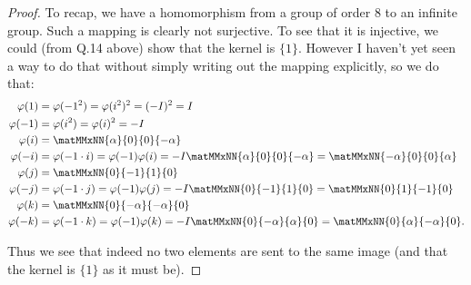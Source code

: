 \begin{proof}
  To recap, we have a homomorphism from a group of order 8 to an infinite group. Such a mapping is
  clearly not surjective. To see that it is injective, we could (from Q.14 above) show that the
  kernel is $\{1\}$. However I haven't yet seen a way to do that without simply writing out the
  mapping explicitly, so we do that:
  \begin{align*}
    \varphi(1) &= \varphi(-1^2) =  \varphi(i^2)^2 = (-I)^2 = I\\
    \varphi(-1) &= \varphi(i^2) = \varphi(i)^2 = -I \\
    \varphi(i) &= \matMMxNN{\alpha}{0}
                      {0}{-\alpha} \\
    \varphi(-i) &= \varphi(-1 \cdot i) = \varphi(-1)\varphi(i) = -I\matMMxNN{\alpha}{0}
                                                {0}{-\alpha} = \matMMxNN{-\alpha}{0}
                                                                   {0}{\alpha}\\
    \varphi(j) &= \matMMxNN{0}{-1}
                     {1}{0} \\
    \varphi(-j) &= \varphi(-1 \cdot j) = \varphi(-1) \varphi(j) = -I\matMMxNN{0}{-1}
                                                  {1}{0} = \matMMxNN{0}{1}
                                                                    {-1}{0}\\
    \varphi(k) &= \matMMxNN{0}{-\alpha}
                    {-\alpha}{0} \\
    \varphi(-k) &=  \varphi(-1 \cdot k) = \varphi(-1) \varphi(k) = -I\matMMxNN{0}{-\alpha}
                                                  {\alpha}{0} = \matMMxNN{0}{\alpha}
                                                                    {-\alpha}{0}.
  \end{align*}

  Thus we see that indeed no two elements are sent to the same image (and that the kernel
  is $\{1\}$ as it must be).
\end{proof}
